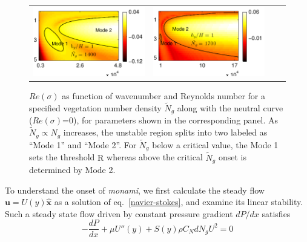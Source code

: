\documentclass[aps,prl,twocolumn,superscriptaddress,10pt]{revtex4-1}  %
\newcommand{\bu}{\mathbf{u}}
\newcommand{\Rey}{\text{R}}
\newcommand{\Ndg}{\tilde{N}_g}
\newcommand{\monami}{\textit{monami}}
\begin{document}
\begin{figure}
\begin{tabular}{cccc}
{\includegraphics[scale = 0.85]{Set5_dens42_imgsc}} &
{\includegraphics[scale = 0.85]{Set5_dens46_imgsc}} \\
\end{tabular}
\caption{$Re(\sigma)$ as function of wavenumber and Reynolds number for a specified vegetation number density $\Ndg$ along with the neutral curve ($Re(\sigma)$=0), for parameters shown in the corresponding panel.  
As $\Ndg \propto N_g$ increases, the unstable region splits into two labeled as ``Mode 1'' and ``Mode 2''. 
For $\Ndg$ below a critical value, the Mode 1 sets the threshold $\Rey$ whereas above the critical $\Ndg$ onset is determined by Mode 2.}
\label{K_Re_sigma_set3}
\end{figure}
To understand the onset of \monami, we first calculate the steady flow $\bu = U(y)\boldsymbol{\hat{x}}$ as a solution of eq.~\eqref{navier-stokes}, and examine its linear stability. 
Such a steady state flow driven by constant pressure gradient $dP/dx$ satisfies 
\begin{equation}
 -\frac{dP}{dx}+\mu U''(y) +S(y) \rho C_N d N_gU^2=0
\label{base_equ}
\end{equation}
\end{document}
